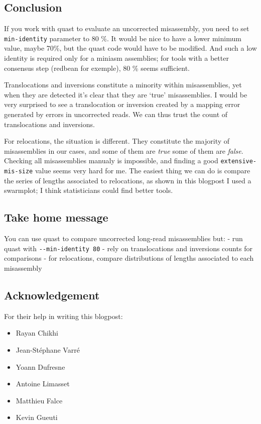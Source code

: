 \documentclass[./main.tex]{subfiles}
\begin{document}
\subsection{Conclusion}\label{conclusion}

If you work with quast to evaluate an uncorrected misassembly, you need
to set \texttt{min-identity} parameter to 80 \%. It would be nice to
have a lower minimum value, maybe 70\%, but the quast code would have to
be modified. And such a low identity is required only for a miniasm
assemblies; for tools with a better consensus step (redbean for
exemple), 80 \% seems sufficient.

Translocations and inversions constitute a minority within
misassemblies, yet when they are detected it's clear that they are
`true' misassemblies. I would be very surprised to see a translocation
or inversion created by a mapping error generated by errors in
uncorrected reads. We can thus trust the count of translocations and
inversions.

For relocations, the situation is different. They constitute the
majority of misassemblies in our cases, and some of them are \emph{true}
some of them are \emph{false}. Checking all misassemblies manualy is
impossible, and finding a good \texttt{extensive-mis-size} value seems
very hard for me. The easiest thing we can do is compare the series of
lengths associated to relocations, as shown in this blogpost I used a
swarmplot; I think statisticians could find better tools.

\subsection{Take home message}\label{take-home-message}

You can use quast to compare uncorrected long-read misassemblies but: -
run quast with \texttt{-\/-min-identity\ 80} - rely on translocations
and inversions counts for comparisons - for relocations, compare
distributions of lengths associated to each misassembly

\subsection{Acknowledgement}\label{acknowledgement}

For their help in writing this blogpost:
\begin{itemize}
    \item Rayan Chikhi
    \item Jean-Stéphane Varré
    \item Yoann Dufresne
    \item Antoine Limasset
    \item Matthieu Falce
    \item Kevin Gueuti
\end{itemize}
\end{document}
